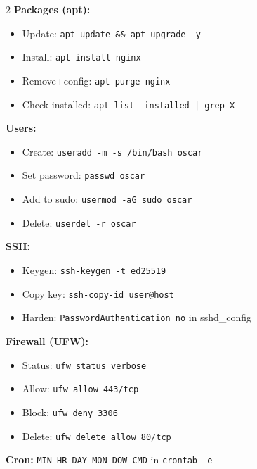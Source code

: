 \documentclass[11pt, letterpaper]{article}
\begin{document}
\begin{tcolorbox}[colback=part2bg, colframe=sectiongreen,
  title={\bfseries Linux Setup Quick Reference}, arc=3pt, boxrule=1pt]
\footnotesize
\begin{multicols}{2}
\textbf{Packages (apt):}
\begin{itemize}[noitemsep, leftmargin=*]
  \item Update: \texttt{apt update \&\& apt upgrade -y}
  \item Install: \texttt{apt install nginx}
  \item Remove+config: \texttt{apt purge nginx}
  \item Check installed: \texttt{apt list --installed | grep X}
\end{itemize}
\textbf{Users:}
\begin{itemize}[noitemsep, leftmargin=*]
  \item Create: \texttt{useradd -m -s /bin/bash oscar}
  \item Set password: \texttt{passwd oscar}
  \item Add to sudo: \texttt{usermod -aG sudo oscar}
  \item Delete: \texttt{userdel -r oscar}
\end{itemize}
\columnbreak
\textbf{SSH:}
\begin{itemize}[noitemsep, leftmargin=*]
  \item Keygen: \texttt{ssh-keygen -t ed25519}
  \item Copy key: \texttt{ssh-copy-id user@host}
  \item Harden: \texttt{PasswordAuthentication no} in sshd\_config
\end{itemize}
\textbf{Firewall (UFW):}
\begin{itemize}[noitemsep, leftmargin=*]
  \item Status: \texttt{ufw status verbose}
  \item Allow: \texttt{ufw allow 443/tcp}
  \item Block: \texttt{ufw deny 3306}
  \item Delete: \texttt{ufw delete allow 80/tcp}
\end{itemize}
\textbf{Cron:} \texttt{MIN HR DAY MON DOW CMD} in \texttt{crontab -e}
\end{multicols}
\end{tcolorbox}

\vspace{4pt}
\end{document}
